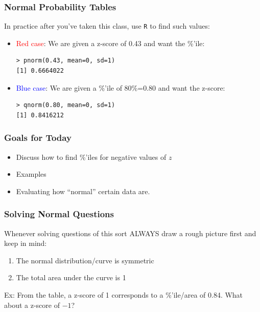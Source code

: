\documentclass[handout]{beamer}
\newcommand{\blue}[1]{\textcolor{blue2}{#1}}
\begin{document}
\begin{frame}[fragile]
\frametitle{Normal Probability Tables}
In practice after you've taken this class, use {\tt R} to find such values:

\begin{itemize}
\item \textcolor{red}{Red case}: We are given a z-score of 0.43 and want the \%'ile:
\begin{verbatim}
> pnorm(0.43, mean=0, sd=1)
[1] 0.6664022
\end{verbatim}
\item \textcolor{blue}{Blue case}:  We are given a \%'ile of 80\%=0.80 and want the z-score:
\begin{verbatim}
> qnorm(0.80, mean=0, sd=1)
[1] 0.8416212
\end{verbatim}
\end{itemize}

\end{frame}


\begin{frame}[fragile]
\frametitle{Goals for Today}

\begin{itemize}
\item Discuss how to find \%'iles for negative values of $z$
\item Examples
\item Evaluating how ``normal'' certain data are.  
\end{itemize}

\end{frame}


\begin{frame}
\frametitle{Solving Normal Questions}
Whenever solving questions of this sort \blue{ALWAYS} draw a rough picture first and keep in mind:
\begin{enumerate}
\item The normal distribution/curve is \blue{symmetric}
\item The total area under the curve is 1
\end{enumerate}

\pause\vspace{0.25cm}

Ex: From the table, a z-score of 1 corresponds to a \%'ile/area of 0.84.  What about a z-score of $-1$?
\vspace{5cm}



\end{frame}
\end{document}
